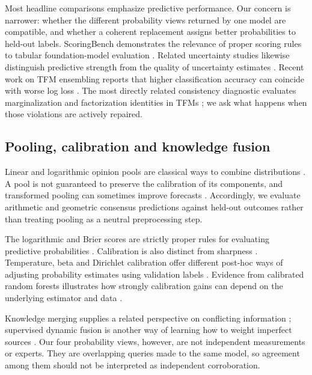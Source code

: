 \documentclass[a4paper,fleqn]{cas-sc}
\begin{document}
Most headline comparisons emphasize predictive performance. Our concern is narrower: whether the different probability views returned by one model are compatible, and whether a coherent replacement assigns better probabilities to held-out labels. ScoringBench demonstrates the relevance of proper scoring rules to tabular foundation-model evaluation \citep{landsgesell2026scoringbench}. Related uncertainty studies likewise distinguish predictive strength from the quality of uncertainty estimates \citep{johnson2026uq,costa2026lowreliability}. Recent work on TFM ensembling reports that higher classification accuracy can coincide with worse log loss \citep{tanna2026ensembling}. The most directly related consistency diagnostic evaluates marginalization and factorization identities in TFMs \citep{klotergens2026agree}; we ask what happens when those violations are actively repaired.

\subsection{Pooling, calibration and knowledge fusion}
Linear and logarithmic opinion pools are classical ways to combine distributions \citep{genest1986combining,heskes1997opinion}. A pool is not guaranteed to preserve the calibration of its components, and transformed pooling can sometimes improve forecasts \citep{ranjan2010combining,gneiting2013combining}. Accordingly, we evaluate arithmetic and geometric consensus predictions against held-out outcomes rather than treating pooling as a neutral preprocessing step.

The logarithmic and Brier scores are strictly proper rules for evaluating predictive probabilities \citep{brier1950,gneiting2007strictly}. Calibration is also distinct from sharpness \citep{gneiting2007calibration}. Temperature, beta and Dirichlet calibration offer different post-hoc ways of adjusting probability estimates using validation labels \citep{guo2017calibration,kull2017beta,kull2019dirichlet}. Evidence from calibrated random forests illustrates how strongly calibration gains can depend on the underlying estimator and data \citep{shaker2025rfcalibration}.

Knowledge merging supplies a related perspective on conflicting information \citep{hunter2006merging}; supervised dynamic fusion is another way of learning how to weight imperfect sources \citep{zhang2025dynamicfusion}. Our four probability views, however, are not independent measurements or experts. They are overlapping queries made to the same model, so agreement among them should not be interpreted as independent corroboration.
\end{document}
